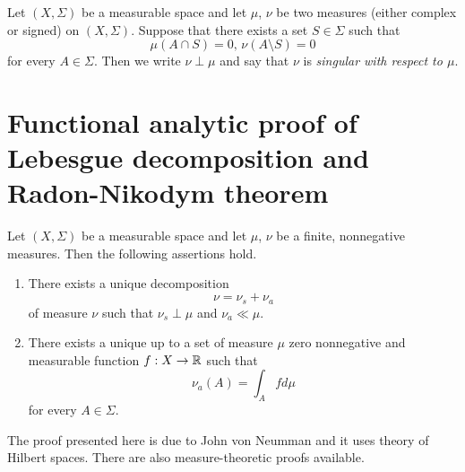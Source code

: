 \begin{definition}
Let $(X,\Sigma)$ be a measurable space and let $\mu$, $\nu$ be two measures (either complex or signed) on $(X,\Sigma)$. Suppose that there exists a set $S\in \Sigma$ such that
$$\mu(A\cap S) = 0,\,\nu(A\setminus S) = 0$$
for every $A \in \Sigma$. Then we write $\nu \perp \mu$ and say that $\nu$ is \textit{singular with respect to $\mu$}.
\end{definition}

\section{Functional analytic proof of Lebesgue decomposition and Radon-Nikodym theorem}

\begin{theorem}\label{theorem:radonnikodymbasic}
Let $(X,\Sigma)$ be a measurable space and let $\mu$, $\nu$ be a finite, nonnegative measures. Then the following assertions hold.
\begin{enumerate}[label=\emph{\textbf{(\arabic*)}}, leftmargin=*]
\item There exists a unique decomposition 
$$\nu = \nu_s + \nu_a$$
of measure $\nu$ such that $\nu_s \perp \mu$ and $\nu_a \ll \mu$.
\item There exists a unique up to a set of measure $\mu$ zero nonnegative and measurable function $f:X\rightarrow{\mathbb R}$ such that
$$\nu_a(A) = \int_A fd\mu$$
for every $A\in \Sigma$.
\end{enumerate} 
\end{theorem}
\noindent
The proof presented here is due to John von Neumman and it uses theory of Hilbert spaces. There are also measure-theoretic proofs available.
